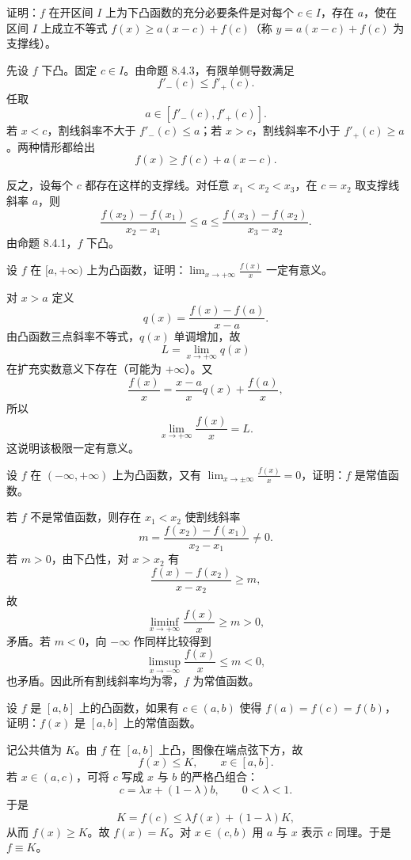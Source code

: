 \begin{xexercise}[11]
证明：$f$ 在开区间 $I$ 上为下凸函数的充分必要条件是对每个 $c\in I$，存在 $a$，使在区间 $I$ 上成立不等式 $f(x)\ge a(x-c)+f(c)$（称 $y=a(x-c)+f(c)$ 为支撑线）。
\end{xexercise}
\begin{xsolution}
先设 $f$ 下凸。固定 $c\in I$。由命题 8.4.3，有限单侧导数满足
\[
  f'_-(c)\le f'_+(c).
\]
任取
\[
  a\in[f'_-(c),f'_+(c)].
\]
若 $x<c$，割线斜率不大于 $f'_-(c)\le a$；若 $x>c$，割线斜率不小于 $f'_+(c)\ge a$。两种情形都给出
\[
  f(x)\ge f(c)+a(x-c).
\]

反之，设每个 $c$ 都存在这样的支撑线。对任意 $x_1<x_2<x_3$，在 $c=x_2$ 取支撑线斜率 $a$，则
\[
  \frac{f(x_2)-f(x_1)}{x_2-x_1}\le a
  \le\frac{f(x_3)-f(x_2)}{x_3-x_2}.
\]
由命题 8.4.1，$f$ 下凸。
\end{xsolution}


\begin{xexercise}[12]
设 $f$ 在 $[a,+\infty)$ 上为凸函数，证明：$\displaystyle\lim_{x\to+\infty}\frac{f(x)}x$ 一定有意义。
\end{xexercise}
\begin{xsolution}
对 $x>a$ 定义
\[
  q(x)=\frac{f(x)-f(a)}{x-a}.
\]
由凸函数三点斜率不等式，$q(x)$ 单调增加，故
\[
  L=\lim_{x\to+\infty}q(x)
\]
在扩充实数意义下存在（可能为 $+\infty$）。又
\[
  \frac{f(x)}x=\frac{x-a}{x}q(x)+\frac{f(a)}x,
\]
所以
\[
  \lim_{x\to+\infty}\frac{f(x)}x=L.
\]
这说明该极限一定有意义。
\end{xsolution}


\begin{xexercise}[13]
设 $f$ 在 $(-\infty,+\infty)$ 上为凸函数，又有 $\displaystyle\lim_{x\to\pm\infty}\frac{f(x)}x=0$，证明：$f$ 是常值函数。
\end{xexercise}
\begin{xsolution}
若 $f$ 不是常值函数，则存在 $x_1<x_2$ 使割线斜率
\[
  m=\frac{f(x_2)-f(x_1)}{x_2-x_1}\ne0.
\]
若 $m>0$，由下凸性，对 $x>x_2$ 有
\[
  \frac{f(x)-f(x_2)}{x-x_2}\ge m,
\]
故
\[
  \liminf_{x\to+\infty}\frac{f(x)}x\ge m>0,
\]
矛盾。若 $m<0$，向 $-\infty$ 作同样比较得到
\[
  \limsup_{x\to-\infty}\frac{f(x)}x\le m<0,
\]
也矛盾。因此所有割线斜率均为零，$f$ 为常值函数。
\end{xsolution}


\begin{xexercise}[14]
设 $f$ 是 $[a,b]$ 上的凸函数，如果有 $c\in(a,b)$ 使得 $f(a)=f(c)=f(b)$，证明：$f(x)$ 是 $[a,b]$ 上的常值函数。
\end{xexercise}
\begin{xsolution}
记公共值为 $K$。由 $f$ 在 $[a,b]$ 上凸，图像在端点弦下方，故
\[
  f(x)\le K,\qquad x\in[a,b].
\]
若 $x\in(a,c)$，可将 $c$ 写成 $x$ 与 $b$ 的严格凸组合：
\[
  c=\lambda x+(1-\lambda)b,\qquad0<\lambda<1.
\]
于是
\[
  K=f(c)\le\lambda f(x)+(1-\lambda)K,
\]
从而 $f(x)\ge K$。故 $f(x)=K$。对 $x\in(c,b)$ 用 $a$ 与 $x$ 表示 $c$ 同理。于是 $f\equiv K$。
\end{xsolution}


